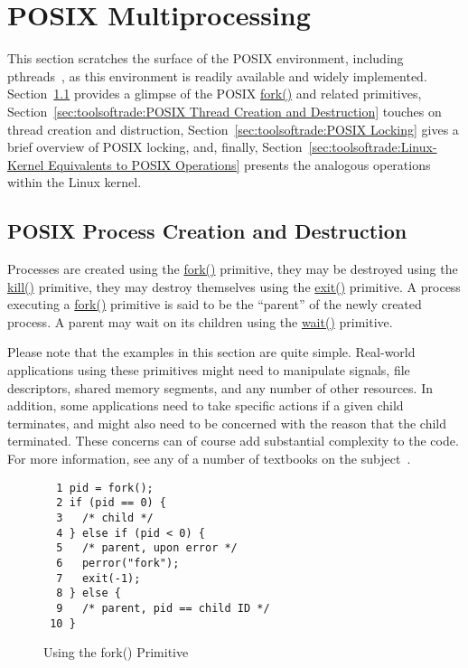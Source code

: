 \section{POSIX Multiprocessing}
\label{sec:toolsoftrade:POSIX Multiprocessing}

This section scratches the surface of the
POSIX environment, including pthreads~\cite{OpenGroup1997pthreads},
as this environment is readily available and widely implemented.
Section~\ref{sec:toolsoftrade:POSIX Process Creation and Destruction}
provides a glimpse of the POSIX \url{fork()} and related primitives,
Section~\ref{sec:toolsoftrade:POSIX Thread Creation and Destruction}
touches on thread creation and distruction,
Section~\ref{sec:toolsoftrade:POSIX Locking} gives a brief overview
of POSIX locking, and, finally,
Section~\ref{sec:toolsoftrade:Linux-Kernel Equivalents to POSIX Operations}
presents the analogous operations within the Linux kernel.

\subsection{POSIX Process Creation and Destruction}
\label{sec:toolsoftrade:POSIX Process Creation and Destruction}

Processes are created using the \url{fork()} primitive, they may
be destroyed using the \url{kill()} primitive, they may destroy
themselves using the \url{exit()} primitive.
A process executing a \url{fork()} primitive is said to be the ``parent''
of the newly created process.
A parent may wait on its children using the \url{wait()} primitive.

Please note that the examples in this section are quite simple.
Real-world applications using these primitives might need to manipulate
signals, file descriptors, shared memory segments, and any number of
other resources.
In addition, some applications need to take specific actions if a given
child terminates, and might also need to be concerned with the reason
that the child terminated.
These concerns can of course add substantial complexity to the code.
For more information, see any of a number of textbooks on the
subject~\cite{WRichardStevens1992}.

\begin{figure}[tbp]
{ \scriptsize
\begin{verbatim}
  1 pid = fork();
  2 if (pid == 0) {
  3   /* child */
  4 } else if (pid < 0) {
  5   /* parent, upon error */
  6   perror("fork");
  7   exit(-1);
  8 } else {
  9   /* parent, pid == child ID */
 10 }
\end{verbatim}
}
\caption{Using the fork() Primitive}
\label{fig:toolsoftrade:Using the fork() Primitive}
\end{figure}

